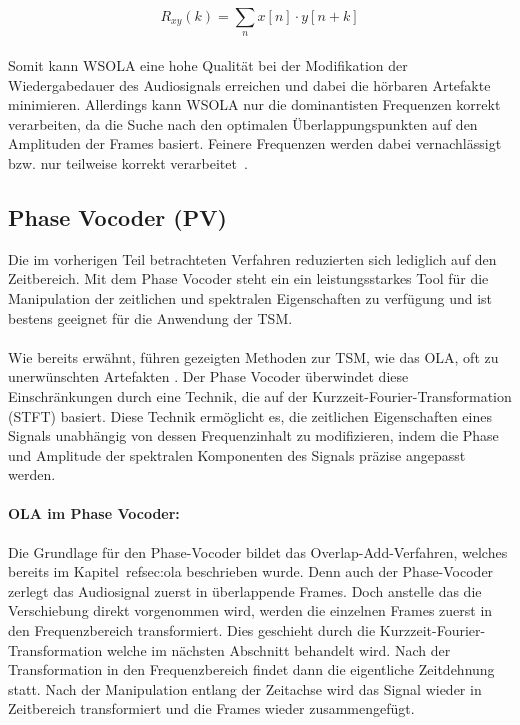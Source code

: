 \begin{equation}
    R_{xy}(k) = \sum_{n} x[n] \cdot y[n + k]
\end{equation}

\paragraph{}
Somit kann WSOLA eine hohe Qualität bei der Modifikation der Wiedergabedauer des Audiosignals erreichen und dabei die hörbaren Artefakte minimieren. Allerdings kann WSOLA nur die dominantisten Frequenzen korrekt verarbeiten, da die Suche nach den optimalen Überlappungspunkten auf den Amplituden der Frames basiert. Feinere Frequenzen werden dabei vernachlässigt bzw. nur teilweise korrekt verarbeitet~\cite{Driedger2016ARO}.

\subsection{Phase Vocoder (PV)}
\label{sec:pv}
Die im vorherigen Teil betrachteten Verfahren reduzierten sich lediglich auf den Zeitbereich. Mit dem Phase Vocoder steht ein ein leistungsstarkes Tool für die Manipulation der zeitlichen und spektralen Eigenschaften zu verfügung und ist bestens geeignet für die Anwendung der TSM.

\paragraph{}
Wie bereits erwähnt, führen gezeigten Methoden zur TSM, wie das OLA, oft zu unerwünschten Artefakten . Der Phase Vocoder überwindet diese Einschränkungen durch eine Technik, die auf der Kurzzeit-Fourier-Transformation (STFT) basiert. Diese Technik ermöglicht es, die zeitlichen Eigenschaften eines Signals unabhängig von dessen Frequenzinhalt zu modifizieren, indem die Phase und Amplitude der spektralen Komponenten des Signals präzise angepasst werden.

\paragraph{OLA im Phase Vocoder:}
Die Grundlage für den Phase-Vocoder bildet das Overlap-Add-Verfahren, welches bereits im Kapitel~ref{sec:ola} beschrieben wurde. Denn auch der Phase-Vocoder zerlegt das Audiosignal zuerst in überlappende Frames. Doch anstelle das die Verschiebung direkt vorgenommen wird, werden die einzelnen Frames zuerst in den Frequenzbereich transformiert. Dies geschieht durch die Kurzzeit-Fourier-Transformation welche im nächsten Abschnitt behandelt wird. Nach der Transformation in den Frequenzbereich findet dann die eigentliche Zeitdehnung statt. Nach der Manipulation entlang der Zeitachse wird das Signal wieder in Zeitbereich transformiert und die Frames wieder zusammengefügt.

